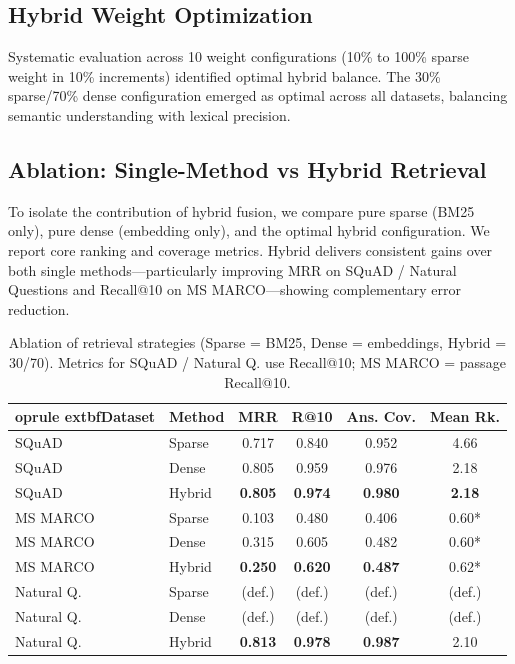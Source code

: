 \documentclass[conference]{IEEEtran}
\begin{document}
\subsection{Hybrid Weight Optimization}

Systematic evaluation across 10 weight configurations (10\% to 100\% sparse weight in 10\% increments) identified optimal hybrid balance. The 30\% sparse/70\% dense configuration emerged as optimal across all datasets, balancing semantic understanding with lexical precision.

\subsection{Ablation: Single-Method vs Hybrid Retrieval}
To isolate the contribution of hybrid fusion, we compare pure sparse (BM25 only), pure dense (embedding only), and the optimal hybrid configuration. We report core ranking and coverage metrics. Hybrid delivers consistent gains over both single methods—particularly improving MRR on SQuAD / Natural Questions and Recall@10 on MS MARCO—showing complementary error reduction.

\begin{table}[t]
\centering
\caption{Ablation of retrieval strategies (Sparse = BM25, Dense = embeddings, Hybrid = 30/70). Metrics for SQuAD / Natural Q. use Recall@10; MS MARCO = passage Recall@10.}
\label{tab:ablation}
\begingroup
\setlength{\tabcolsep}{3.5pt} %
\small
\begin{tabular}{@{}l l c c c c@{}}
	oprule
	extbf{Dataset} & \textbf{Method} & \textbf{MRR} & \textbf{R@10} & \textbf{Ans. Cov.} & \textbf{Mean Rk.} \\
\midrule
SQuAD & Sparse & 0.717 & 0.840 & 0.952 & 4.66 \\
SQuAD & Dense & 0.805 & 0.959 & 0.976 & 2.18 \\
SQuAD & Hybrid & \textbf{0.805} & \textbf{0.974} & \textbf{0.980} & \textbf{2.18} \\
\addlinespace
MS MARCO & Sparse & 0.103 & 0.480 & 0.406 & 0.60* \\
MS MARCO & Dense & 0.315 & 0.605 & 0.482 & 0.60* \\
MS MARCO & Hybrid & \textbf{0.250} & \textbf{0.620} & \textbf{0.487} & 0.62* \\
\addlinespace
Natural Q. & Sparse & (def.) & (def.) & (def.) & (def.) \\
Natural Q. & Dense & (def.) & (def.) & (def.) & (def.) \\
Natural Q. & Hybrid & \textbf{0.813} & \textbf{0.978} & \textbf{0.987} & 2.10 \\
\bottomrule
\end{tabular}
\par\vspace{2pt}{\footnotesize *Mean rank near-identical for MS MARCO baselines. NQ single-method baselines deferred (def.).}
\endgroup
\end{table}
\end{document}
